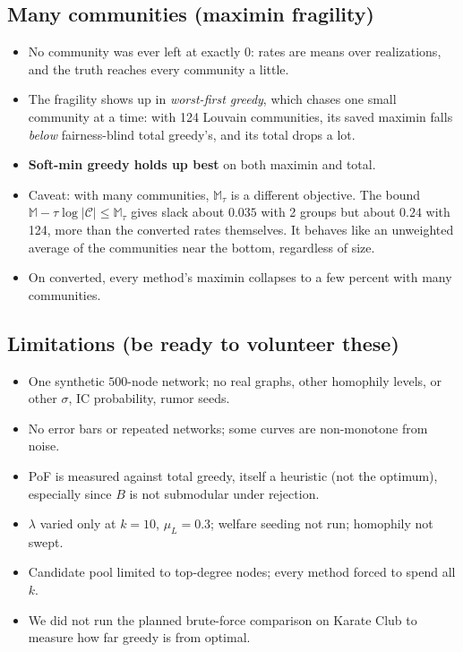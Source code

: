 \documentclass[11pt]{article}
\newcommand{\M}{\mathbb{M}}
\begin{document}
\subsection{Many communities (maximin fragility)}
\begin{itemize}
\item No community was ever left at exactly $0$: rates are means over realizations, and the truth reaches every community a little.
\item The fragility shows up in \emph{worst-first greedy}, which chases one small community at a time: with 124 Louvain communities, its saved maximin falls \emph{below} fairness-blind total greedy's, and its total drops a lot.
\item \textbf{Soft-min greedy holds up best} on both maximin and total.
\item Caveat: with many communities, $\M_\tau$ is a different objective. The bound $\M-\tau\log|\mathcal C|\le\M_\tau$ gives slack about $0.035$ with 2 groups but about $0.24$ with 124, more than the converted rates themselves. It behaves like an unweighted average of the communities near the bottom, regardless of size.
\item On converted, every method's maximin collapses to a few percent with many communities.
\end{itemize}

\subsection{Limitations (be ready to volunteer these)}
\begin{itemize}
\item One synthetic $500$-node network; no real graphs, other homophily levels, or other $\sigma$, IC probability, rumor seeds.
\item No error bars or repeated networks; some curves are non-monotone from noise.
\item PoF is measured against total greedy, itself a heuristic (not the optimum), especially since $B$ is not submodular under rejection.
\item $\lambda$ varied only at $k=10$, $\mu_L=0.3$; welfare seeding not run; homophily not swept.
\item Candidate pool limited to top-degree nodes; every method forced to spend all $k$.
\item We did not run the planned brute-force comparison on Karate Club to measure how far greedy is from optimal.
\end{itemize}
\end{document}
